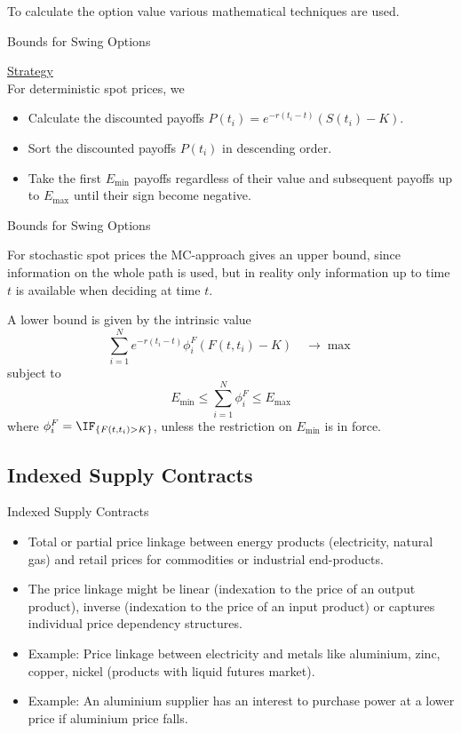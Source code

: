 To calculate the option value various mathematical techniques are used.


{Bounds for Swing Options}

\underline{Strategy}\\
For deterministic spot prices, we
\begin{itemize}
  \item  Calculate the discounted payoffs
  $P(t_i)=e^{-r(t_i-t)}(S(t_i)-K)$.
  \item  Sort the discounted payoffs $P(t_i)$ in descending order.
  \item Take the first $E_{\min}$ payoffs regardless of their
  value and subsequent payoffs up to $E_{\max}$ until their sign
  become negative.
\end{itemize}


{Bounds for Swing Options}

For stochastic spot prices the MC-approach gives an upper bound,
since information on the whole path is used, but in reality only
information up to time $t$ is available when deciding at time $t$.

A lower bound is given by the intrinsic value
$$\sum_{i=1}^Ne^{-r(t_i-t)} \phi_i^F (F(t,t_i)-K) \quad\rightarrow\max$$
subject to $$E_{\min}\leq\sum_{i=1}^N\phi^F_i\leq E_{\max}$$
where $\phi_i^F=\IF_{\{F(t,t_i)>K\}}$, unless the restriction on $E_{\min}$ is in force.


\subsection{Indexed Supply Contracts}


{Indexed Supply Contracts}
\begin{itemize}
  \item<1-> Total or partial price linkage between energy products (electricity, natural gas) and retail prices for commodities or industrial end-products.
  \item<2-> The price linkage might be linear (indexation to the price of an output product), inverse (indexation to the price of an input product) or captures individual price dependency structures.
  \item<3-> Example: Price linkage between electricity and metals like aluminium, zinc, copper, nickel (products with liquid futures market).
  \item<4-> Example: An aluminium supplier has an interest to purchase power at a lower price if aluminium price falls.
\end{itemize}



